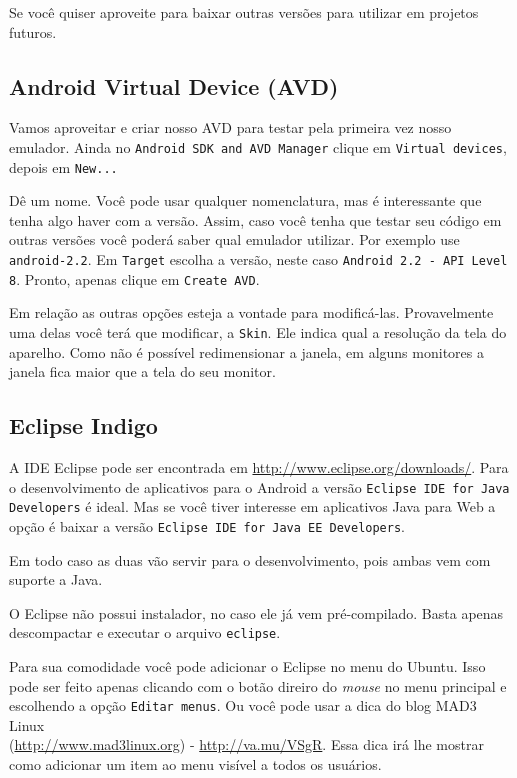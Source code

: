 Se você quiser aproveite para baixar outras versões para utilizar em projetos futuros.

\subsection{Android Virtual Device (AVD)}

Vamos aproveitar e criar nosso AVD para testar pela primeira vez nosso emulador. Ainda no
\texttt{Android SDK and AVD Manager} clique em \texttt{Virtual devices}, depois em \texttt{New...}

Dê um nome. Você pode usar qualquer nomenclatura, mas é interessante que tenha algo haver com a versão. Assim,
caso você tenha que testar seu código em outras versões você poderá saber qual emulador utilizar. Por
exemplo use \texttt{android-2.2}. Em \texttt{Target} escolha a versão, neste caso
\texttt{Android 2.2 - API Level 8}. Pronto, apenas clique em \texttt{Create AVD}.

Em relação as outras opções esteja a vontade para modificá-las. Provavelmente uma delas você terá que
modificar, a \texttt{Skin}. Ele indica qual a resolução da tela do aparelho. Como não é possível
redimensionar a janela, em alguns monitores a janela fica maior que a tela do seu monitor.

\subsection{Eclipse Indigo}

A IDE Eclipse pode ser encontrada em \url{http://www.eclipse.org/downloads/}. Para o desenvolvimento
de aplicativos para o Android a versão \texttt{Eclipse IDE for Java Developers} é ideal. Mas se você
tiver interesse em aplicativos Java para Web a opção é baixar a versão \texttt{Eclipse IDE for Java EE Developers}.

Em todo caso as duas vão servir para o desenvolvimento, pois ambas vem com suporte a Java.

O Eclipse não possui instalador, no caso ele já vem pré-compilado. Basta apenas descompactar e executar
o arquivo \texttt{eclipse}.

Para sua comodidade você pode adicionar o Eclipse no menu do Ubuntu. Isso pode ser feito apenas clicando
com o botão direiro do \textit{mouse} no menu principal e escolhendo a opção \texttt{Editar menus}. Ou você pode
usar a dica do blog MAD3 Linux \\ (\url{http://www.mad3linux.org}) - \url{http://va.mu/VSgR}. Essa dica irá
lhe mostrar como adicionar um item ao menu visível a todos os usuários.

